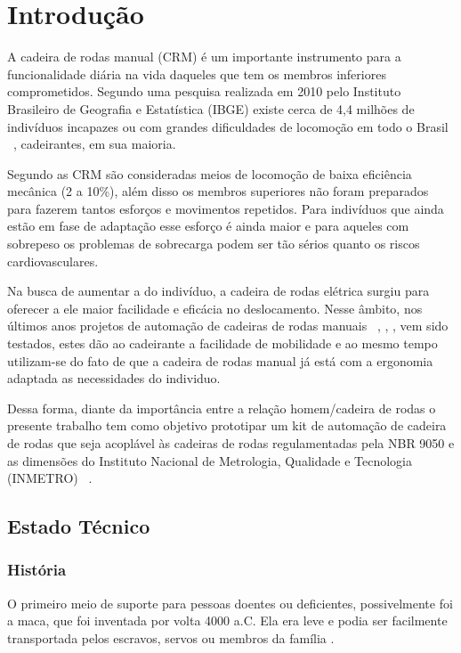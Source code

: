 \chapter[Introdução]{Introdução}

A cadeira de rodas manual (CRM) é um importante instrumento para a funcionalidade diária na vida daqueles que tem os membros inferiores comprometidos. Segundo uma pesquisa realizada em 2010 pelo Instituto Brasileiro de Geografia e Estatística (IBGE) existe cerca de 4,4 milhões de indivíduos incapazes ou com grandes dificuldades de locomoção em todo o Brasil ~\cite{ibge:cartilha:2010}, cadeirantes, em sua maioria.

Segundo \cite{sagawa} as CRM são consideradas meios de locomoção de baixa eficiência mecânica (2 a 10\%), além disso os membros superiores não foram preparados para fazerem tantos esforços e movimentos repetidos. Para indivíduos que ainda estão em fase de adaptação esse esforço é ainda maior e para aqueles com sobrepeso os problemas de sobrecarga podem ser tão sérios quanto os riscos cardiovasculares.

Na busca de aumentar a do indivíduo, a cadeira de rodas elétrica surgiu para oferecer a ele maior facilidade e eficácia no deslocamento. Nesse âmbito, nos últimos anos projetos de automação de cadeiras de rodas manuais ~\cite{brunel:wheelchair:2004}, \cite{artigo_rudi}, \cite{patent_cadeira_rodas_eletrica},	 \cite{marcos:controle:2002}  vem sido testados, estes dão ao cadeirante a facilidade de mobilidade  e ao mesmo tempo utilizam-se do fato de que a cadeira de rodas manual já está com a ergonomia adaptada as necessidades do individuo.

Dessa forma, diante da importância entre a relação homem/cadeira de rodas o presente trabalho tem como objetivo prototipar um kit de automação de cadeira de rodas que seja acoplável às cadeiras de rodas regulamentadas pela NBR 9050 \cite{nbr9050} e as dimensões do  Instituto Nacional de Metrologia, Qualidade e Tecnologia (INMETRO) ~\cite{inmetro}.


\section{Estado Técnico}

\subsection{História}
O primeiro meio de suporte para pessoas doentes ou deficientes, possivelmente foi a maca, que foi inventada por volta 4000 a.C. Ela era leve e podia ser facilmente transportada pelos escravos, servos ou membros da família \cite{souza}.

